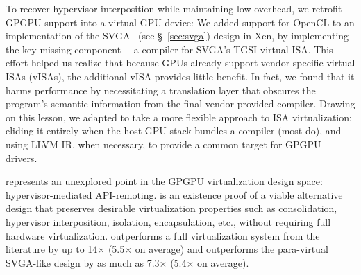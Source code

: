 To recover hypervisor interposition while maintaining low-overhead,
we retrofit GPGPU support into a virtual GPU device:
We added support for OpenCL to an implementation of the SVGA~\cite{svga} (see \S~\ref{sec:svga}) design in Xen,
by implementing the key missing component---%
a compiler for SVGA's TGSI virtual ISA.
This effort helped us realize that because GPUs already support vendor-specific
virtual ISAs (vISAs), the additional vISA
provides little benefit.
In fact, we found that it harms performance by necessitating a translation layer that obscures the program's semantic information from the final vendor-provided compiler.
Drawing on this lesson, we adapted \Trillium to take a more flexible approach to ISA virtualization: eliding it entirely when the host GPU stack bundles a compiler (most do), and using LLVM IR, when necessary, to provide a common target for GPGPU drivers.


\Trillium represents an unexplored point in the GPGPU virtualization design space:
hypervisor-mediated API-remoting.
\Trillium is an existence proof of a viable alternative design that preserves desirable
virtualization properties such as consolidation, hypervisor interposition, isolation,
encapsulation, etc., without requiring full hardware virtualization.
\Trillium outperforms a full virtualization system from the literature
by up to 14$\times$ (5.5$\times$ on average) and outperforms the para-virtual
SVGA-like design by as much as 7.3$\times$ (5.4$\times$ on average).


